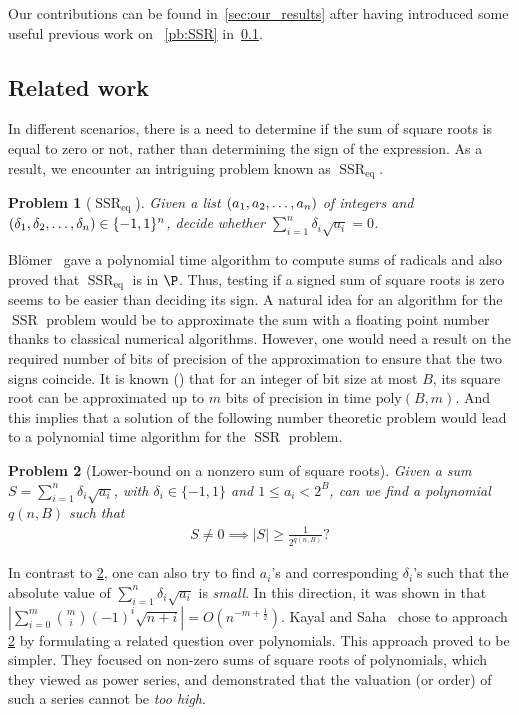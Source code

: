 \documentclass[a4paper, 11pt,dvipsnames]{article}
\newtheorem{problem}{Problem}
\newcommand\abs[1]{\left|#1\right|}
\newcommand{\SSR}{\operatorname{SSR}}
\newcommand{\SSReq}{\operatorname{SSR}_{\operatorname{eq}}}
\begin{document}
Our contributions can be found in~\cref{sec:our_results} after having introduced some useful previous work on ~\cref{pb:SSR} in~\cref{sec:relatedwork}.
\subsection{Related work}\label{sec:relatedwork}

In different scenarios, there is a need to determine if the sum of square roots is equal to zero or not, rather than determining the sign of the expression. As a result, we encounter an intriguing problem known as $\SSReq$.

\begin{problem}[$\SSReq$] Given a list $(a_{1},a_{2},\dots,a_{n})$ of integers and $(\delta_{1},\delta_{2},\dots,\delta_{n}) \in \{-1,1\}^n$, decide whether $\sum_{i=1}^n \delta_i \sqrt{a_i} = 0$.
\label{pb:SSReq} 
\end{problem}
Bl{\"o}mer~\cite{blomer1993computing} gave a polynomial time algorithm to compute sums of radicals and also proved that $\SSReq$ is in $\P$. Thus, testing if a signed sum
of square roots is zero seems to be easier than deciding its sign.  A natural idea for an algorithm for the $\SSR$ problem would be to approximate the sum with
a floating point number thanks to classical numerical algorithms. However, one would need a result on the required number of bits of precision of the
approximation to ensure that the two signs coincide. It is known (\cite{brent1976fast}) that for an integer of bit size at most $B$, its square root can be
approximated up to $m$ bits of precision in time $\mathrm{poly}(B,m)$. And this implies that a solution of the following number theoretic problem would lead to a
polynomial time algorithm for the $\SSR$ problem.
\begin{problem} [Lower-bound on a nonzero sum of square roots] Given a sum $S = \sum_{i=1}^n \delta_i \sqrt{a_i}$, with $\delta_i \in \{-1,1\}$ and $1 \le a_i <
  2^B$, can we find a polynomial $q(n,B)$ such that \begin{align*} S \neq 0 \implies \abs{S} \ge \frac{1}{2^{q(n,B)}}?  \end{align*}
\label{pb:SSR_lower_bd} 
\end{problem}
In contrast to \cref{pb:SSR_lower_bd}, one can also try to find $a_i$'s and corresponding $\delta_i$'s such that the absolute value of  $\sum_{i=1}^n \delta_i \sqrt{a_i}$  is \emph{small}. In this direction, it was shown in \cite{QIAN2006194} that $\abs{\sum_{i=0}^m\binom{m}{i} (-1)^i\sqrt{n+i}}=O(n^{-m+\frac{1}{2}})$. Kayal and Saha~\cite{kayal2012sum} chose to approach \cref{pb:SSR_lower_bd} by formulating a related question over polynomials. This approach proved to be simpler. They focused on non-zero sums of square roots of polynomials, which they viewed as power series, and demonstrated that the valuation (or order) of such a series cannot be \emph{too high}.
\end{document}
